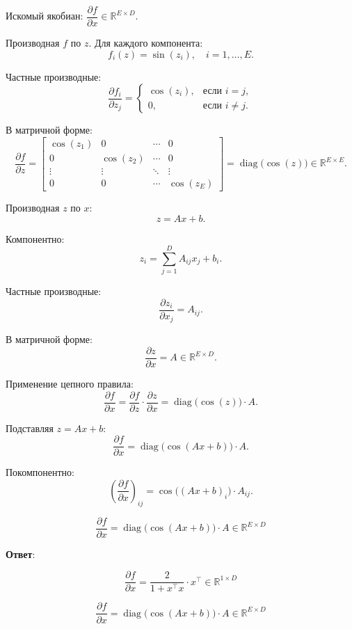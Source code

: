 \documentclass[pract]{SCWorks}
\begin{document}
    Искомый якобиан: $\dfrac{\partial f}{\partial x} \in \mathbb{R}^{E \times D}$.

    Производная $f$ по $z$. Для каждого компонента:
    \[
    f_i(z) = \sin(z_i), \quad i = 1, \dots, E.
    \]

    Частные производные:
    \[
    \frac{\partial f_i}{\partial z_j} =
    \begin{cases}
    \cos(z_i), & \text{если } i = j, \\
    0, & \text{если } i \neq j.
    \end{cases}
    \]

    В матричной форме:
    \[
    \frac{\partial f}{\partial z} =
    \begin{bmatrix}
    \cos(z_1) & 0 & \cdots & 0 \\
    0 & \cos(z_2) & \cdots & 0 \\
    \vdots & \vdots & \ddots & \vdots \\
    0 & 0 & \cdots & \cos(z_E)
    \end{bmatrix}
    = \operatorname{diag}\big(\cos(z)\big) \in \mathbb{R}^{E \times E}.
    \]

    Производная $z$ по $x$:
    \[
    z = Ax + b.
    \]

    Компонентно:
    \[
    z_i = \sum_{j=1}^D A_{ij} x_j + b_i.
    \]

    Частные производные:
    \[
    \frac{\partial z_i}{\partial x_j} = A_{ij}.
    \]

    В матричной форме:
    \[
    \frac{\partial z}{\partial x} = A \in \mathbb{R}^{E \times D}.
    \]

    Применение цепного правила:
    \[
    \frac{\partial f}{\partial x} = \frac{\partial f}{\partial z} \cdot \frac{\partial z}{\partial x}
    = \operatorname{diag}\big(\cos(z)\big) \cdot A.
    \]

    Подставляя $z = Ax + b$:
    \[
    \frac{\partial f}{\partial x} = \operatorname{diag}\big(\cos(Ax + b)\big) \cdot A.
    \]

    Покомпонентно:
    \[
    \left(\frac{\partial f}{\partial x}\right)_{ij} = \cos\big((Ax + b)_i\big) \cdot A_{ij}.
    \]

    \[
    \boxed{\frac{\partial f}{\partial x} = \operatorname{diag}\big(\cos(Ax + b)\big) \cdot A \in \mathbb{R}^{E \times D}}
    \]

    \textbf{Ответ}:
    \item[$\bullet$]
    \[
    \boxed{\frac{\partial f}{\partial x} = \frac{2}{1 + x^\top x} \cdot x^\top \in \mathbb{R}^{1 \times D}}
    \]
    \item[$\bullet$]
    \[
    \boxed{\frac{\partial f}{\partial x} = \operatorname{diag}\big(\cos(Ax + b)\big) \cdot A \in \mathbb{R}^{E \times D}}
    \]
\end{document}
